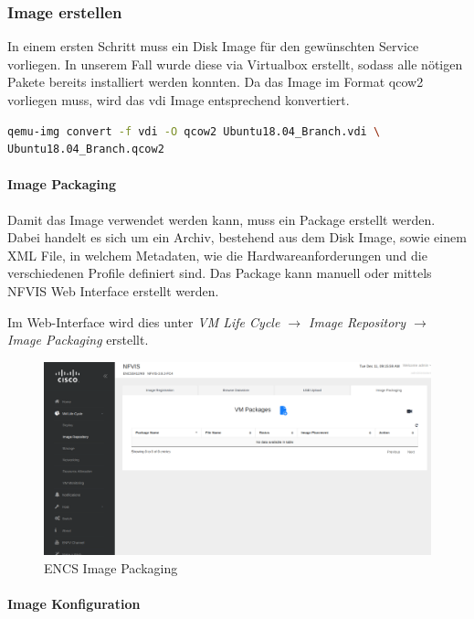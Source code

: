 \subsubsection{Image erstellen}

In einem ersten Schritt muss ein Disk Image für den gewünschten Service vorliegen. In unserem Fall wurde diese via Virtualbox erstellt, sodass alle nötigen Pakete bereits installiert werden konnten. Da das Image im Format qcow2 vorliegen muss, wird das vdi Image entsprechend konvertiert.

\begin{lstlisting}[language=bash]
qemu-img convert -f vdi -O qcow2 Ubuntu18.04_Branch.vdi \
Ubuntu18.04_Branch.qcow2
\end{lstlisting}

\paragraph{Image Packaging}

Damit das Image verwendet werden kann, muss ein Package erstellt werden. Dabei handelt es sich um ein Archiv, bestehend aus dem Disk Image, sowie einem XML File, in welchem Metadaten, wie die Hardwareanforderungen und die verschiedenen Profile definiert sind.
Das Package kann manuell oder mittels NFVIS Web Interface erstellt werden.

Im Web-Interface wird dies unter \textit{VM Life Cycle $\rightarrow$ Image Repository $\rightarrow$ Image Packaging} erstellt.

\begin{figure}[H]
	\centering
	\includegraphics[width=0.8\linewidth]{img/Absicherung/ENCS-Image-Packaging.png}
	\caption{ENCS Image Packaging}
	\label{fig:ENCS Image Packaging}
\end{figure}

\paragraph{Image Konfiguration}

